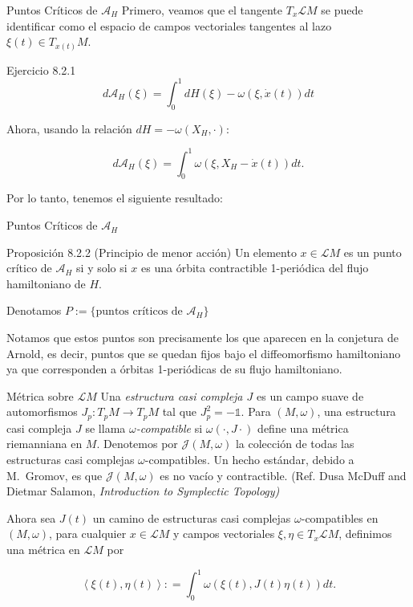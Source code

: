 \documentclass{beamer}
\newcounter{Ejercicio}
\begin{document}
\begin{frame}{Puntos Críticos de $\mathcal A_H$}
Primero, veamos que el tangente $T_x\mathcal LM$ se puede identificar como el espacio de campos vectoriales tangentes al lazo $\xi(t) \in T_{x(t)} M$. \pause

  \begin{block}{Ejercicio 8.2.1}
\[d\mathcal A_H(\xi) = \int_0^1 dH(\xi) - \omega(\xi, \dot{x}(t))dt\] \pause

 \end{block}
Ahora, usando la relación $dH = - \omega(X_H, \cdot)$: \pause

\[ d\mathcal A_H(\xi) = \int_0^1 \omega(\xi, X_H - \dot{x}(t)) dt.\] \pause

Por lo tanto, tenemos el siguiente resultado:


\end{frame}

\begin{frame}{Puntos Críticos de $\mathcal A_H$}
  \begin{block}{Proposición 8.2.2} (Principio de menor acción)
Un elemento $x \in \mathcal LM$ es un punto crítico de $\mathcal A_H$ si y solo si $x$ es una órbita contractible 1-periódica del flujo hamiltoniano de $H$.\pause

 \end{block} 

 Denotamos $P:= \{ \mbox{puntos críticos de $\mathcal A_H$} \}$

 \pause
 
 Notamos que estos puntos son precisamente los que aparecen en la conjetura de Arnold, es decir, puntos que se quedan fijos bajo el diffeomorfismo hamiltoniano ya que corresponden a órbitas 1-periódicas de su flujo hamiltoniano.

\end{frame}

\begin{frame}{Métrica sobre $\mathcal LM$ }
Una {\it estructura casi compleja $J$} es un campo suave de automorfismos $J_p: T_p M \to T_p M$ tal que $J_p^2 = -\mathds{1}$. \pause Para $(M, \omega)$, una estructura casi compleja $J$ se llama {\it $\omega$-compatible} si $\omega(\cdot, J\cdot)$ define una métrica riemanniana en $M$. \pause Denotemos por $\mathcal J(M, \omega)$ la colección de todas las estructuras casi complejas $\omega$-compatibles. \pause Un hecho estándar, debido a M.~Gromov, es que $\mathcal J(M, \omega)$ es no vacío y contractible. (Ref. Dusa McDuff and Dietmar Salamon, \it{Introduction to Symplectic Topology}) \pause

Ahora sea $J(t)$ un camino de estructuras casi complejas $\omega$-compatibles en $(M, \omega)$, para cualquier $x \in \mathcal LM$ y campos vectoriales $\xi, \eta \in T_x \mathcal LM$, definimos una métrica en $\mathcal LM$ por \pause

\[\left< \xi(t), \eta(t) \right> : = \int_0^1 \omega(\xi(t), J(t) \eta(t)) dt.\]

\end{frame}
\end{document}
